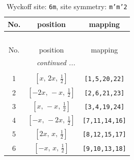 \documentclass[fleqn,8pt]{jsarticle}
\begin{document}
\renewcommand{\arraystretch}{1.2}
\begin{longtable}{ccc}
\caption{Wyckoff site: {\tt 6m}, site symmetry: {\tt m'm'2}}
 \\
 \hline \hline
No. & position & mapping \\ \hline \endfirsthead

\multicolumn{2}{l}{\tablename\ \thetable{}} \\
 \hline \hline
No. & position & mapping \\ \hline \endhead

 \hline \hline
\multicolumn{2}{r}{\footnotesize\it continued ...} \\ \endfoot

 \hline \hline
\multicolumn{2}{r}{} \\ \endlastfoot

1 & $\left[ x,\, 2 x,\, \frac{1}{2} \right]$ & {\tt [1,5,20,22]} \\ \hline
2 & $\left[ - 2 x,\, - x,\, \frac{1}{2} \right]$ & {\tt [2,6,21,23]} \\ \hline
3 & $\left[ x,\, - x,\, \frac{1}{2} \right]$ & {\tt [3,4,19,24]} \\ \hline
4 & $\left[ - x,\, - 2 x,\, \frac{1}{2} \right]$ & {\tt [7,11,14,16]} \\ \hline
5 & $\left[ 2 x,\, x,\, \frac{1}{2} \right]$ & {\tt [8,12,15,17]} \\ \hline
6 & $\left[ - x,\, x,\, \frac{1}{2} \right]$ & {\tt [9,10,13,18]} \\
\end{longtable}
\renewcommand{\arraystretch}{1.2}
\end{document}
